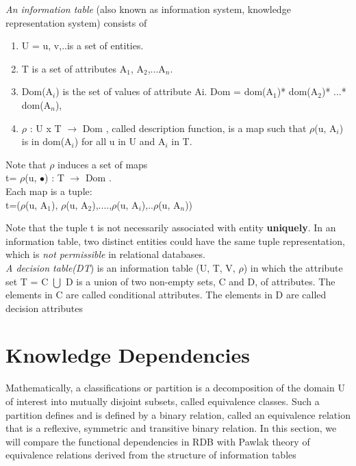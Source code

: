 \documentclass[12pt]{article}
\begin{document}
\textit{An information table} (also known as information
system,
knowledge representation system) consists of \\
\begin{enumerate}
  \item U = {u, v,..}is a set of entities.
  \item T is a set of attributes {A$_{1}$,
      A$_{2}$,...A$_{n}$}.
  \item Dom(A$_{i}$) is the set of values of attribute Ai.
	Dom = dom(A$_{1}$)* dom(A$_{2}$)* ...* dom(A$_{n}$),
  \item $\rho$ : U x T $\rightarrow$ Dom , called
      description function, is a 	map such that
	$\rho$(u, A$_{i}$) is in dom(A$_{i}$) for all u in U
and A$_{i}$ in T.
\end{enumerate}
Note that $\rho$ induces a set of maps\\
 t= $\rho$(u, $\bullet$) : T $\rightarrow$ Dom .\\
Each map is a tuple:  \\

t=($\rho$(u, A$_{1}$), $\rho$(u, A$_{2}$),....,$\rho$(u,
A$_{i}$),..$\rho$(u, A$_{n}$))

Note that the tuple t is not necessarily associated with entity
\textbf{uniquely}. In an information table, two distinct
entities could have the same tuple representation, which is
\textit{not permissible} in relational databases.\\
\textit{A decision table(DT}) is an information table (U, T, V,
$\rho$) in which the attribute set T = C $\bigcup$ D is a union
of two non-empty sets, C and D, of attributes. The elements in
C are called conditional attributes. The elements in D are
called decision attributes
\section{Knowledge Dependencies}\label{sec4}
Mathematically, a classifications or partition is a decomposition of the domain U of interest into mutually disjoint subsets, called equivalence classes. Such a partition defines and is defined by a binary relation, called an equivalence relation that is a reflexive, symmetric and transitive binary relation. In this section, we will compare the functional dependencies in RDB with Pawlak theory of equivalence relations derived from the structure of  information tables
\end{document}
